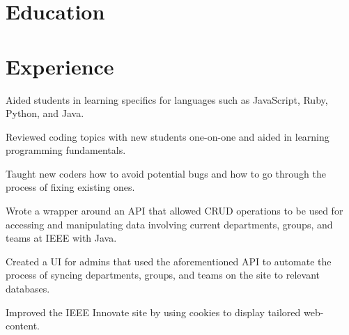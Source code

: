 \documentclass[]{deedy-resume-openfont}
\begin{document}
%
%




\section{Education}

\vspace{1mm}

\sectionsep


\section{Experience}

\vspace{1mm}

\vspace{1mm}
\begin{tightemize} \itemsep 7pt
\item Aided students in learning specifics for languages such as JavaScript, Ruby, Python, and Java.
\item Reviewed coding topics with new students one-on-one and aided in learning programming fundamentals.
\item Taught new coders how to avoid potential bugs and how to go through the process of fixing existing ones.
\end{tightemize}
\sectionsep

\vspace{1mm}
\begin{tightemize} \itemsep 7pt
\item Wrote a wrapper around an API that allowed CRUD operations to be used for accessing and manipulating data involving current departments, groups, and teams at IEEE with Java.
\item Created a UI for admins that used the aforementioned API to automate the
process of syncing departments, groups, and teams on the site to relevant databases.
\item Improved the IEEE Innovate site by using cookies to display tailored web-content.
\end{tightemize}
\sectionsep
\end{document}
